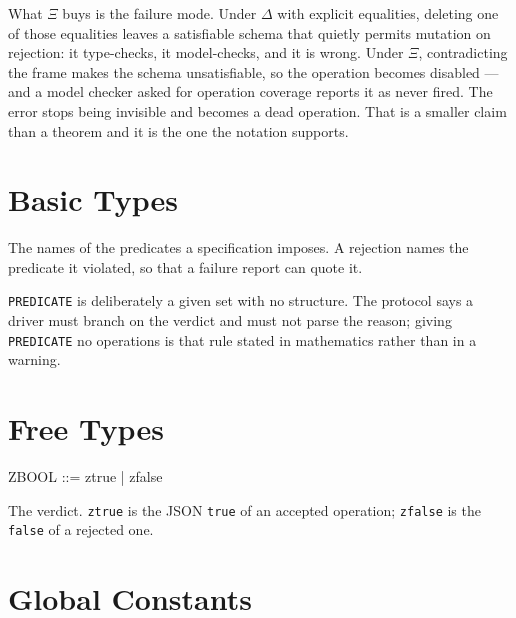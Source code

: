 \documentclass[a4paper,10pt,fleqn]{article}
\begin{document}
What $\Xi$ buys is the failure mode. Under $\Delta$ with explicit
equalities, deleting one of those equalities leaves a satisfiable schema
that quietly permits mutation on rejection: it type-checks, it
model-checks, and it is wrong. Under $\Xi$, contradicting the frame makes
the schema unsatisfiable, so the operation becomes disabled --- and a
model checker asked for operation coverage reports it as never fired.
The error stops being invisible and becomes a dead operation. That is a
smaller claim than a theorem and it is the one the notation supports.

\section{Basic Types}

\begin{zed}
  [PREDICATE]
\end{zed}

The names of the predicates a specification imposes. A rejection names
the predicate it violated, so that a failure report can quote it.

\texttt{PREDICATE} is deliberately a given set with no structure. The
protocol says a driver must branch on the verdict and must not parse the
reason; giving \texttt{PREDICATE} no operations is that rule stated in
mathematics rather than in a warning.

\section{Free Types}

\begin{zed}
  ZBOOL ::= ztrue | zfalse
\end{zed}

The verdict. \texttt{ztrue} is the JSON \texttt{true} of an accepted
operation; \texttt{zfalse} is the \texttt{false} of a rejected one.

\section{Global Constants}
\end{document}
